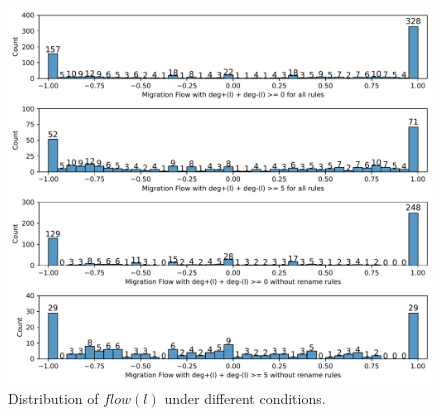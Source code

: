 \documentclass[sigconf, screen]{acmart}
\begin{document}
\begin{figure}
\centering
  \includegraphics[width=\linewidth]{fig/flow.pdf}
  \vspace{-7mm}
  \caption{Distribution of $flow(l)$ under different conditions.}
  \label{fig:flow}
  \vspace{-4mm}
\end{figure}
\end{document}

